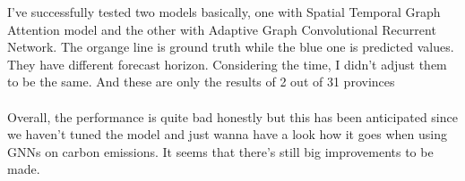\documentclass[light]{lutbeamer} %
\begin{document}
\begin{frame}
{        I've successfully tested two models basically, one with Spatial Temporal Graph Attention model and the other with Adaptive Graph Convolutional Recurrent Network. The organge line is ground truth while the blue one is predicted values. They have different forecast horizon. Considering the time, I didn't adjust them to be the same. And these are only the results of 2 out of 31 provinces\\~\\

        Overall, the performance is quite bad honestly but this has been anticipated since we haven't tuned the model and just wanna have a look how it goes when using GNNs on carbon emissions. It seems that there's still big improvements to be made. \\~\\
    }
\end{frame}
\end{document}
